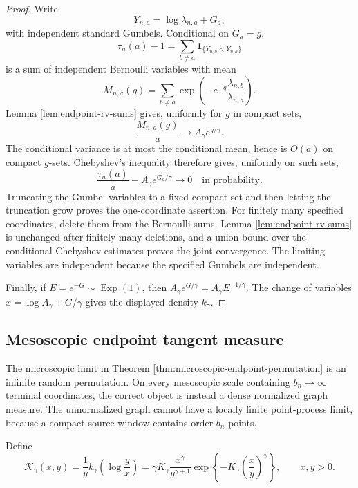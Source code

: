 \documentclass[11pt]{article}
\theoremstyle{remark}
\newcommand{\one}{\mathbf 1}
\newcommand{\Exp}{\operatorname{Exp}}
\begin{document}
\begin{proof}
Write
\[
        Y_{n,a}=\log\lambda_{n,a}+G_a,
\]
with independent standard Gumbels.  Conditional on $G_a=g$,
\[
        \tau_n(a)-1
        =\sum_{b\ne a}\one_{\{Y_{n,b}<Y_{n,a}\}}
\]
is a sum of independent Bernoulli variables with mean
\[
        M_{n,a}(g)=\sum_{b\ne a}
        \exp\left(-e^{-g}\frac{\lambda_{n,b}}{\lambda_{n,a}}\right).
\]
Lemma \ref{lem:endpoint-rv-sums} gives, uniformly for $g$ in compact sets,
\[
        \frac{M_{n,a}(g)}a\longrightarrow
        A_\gamma e^{g/\gamma}.
\]
The conditional variance is at most the conditional mean, hence is $O(a)$ on
compact $g$-sets.  Chebyshev's inequality therefore gives, uniformly on such
sets,
\[
        \frac{\tau_n(a)}a-A_\gamma e^{G_a/\gamma}
        \longrightarrow0
        \quad\text{in probability}.
\]
Truncating the Gumbel variables to a fixed compact set and then letting the
truncation grow proves the one-coordinate assertion.  For finitely many
specified coordinates, delete them from the Bernoulli sums.  Lemma
\ref{lem:endpoint-rv-sums} is unchanged after finitely many deletions, and a
union bound over the conditional Chebyshev estimates proves the joint
convergence.  The limiting variables are independent because the specified
Gumbels are independent.

Finally, if $E=e^{-G}\sim\Exp(1)$, then
$A_\gamma e^{G/\gamma}=A_\gamma E^{-1/\gamma}$.  The change of variables
$x=\log A_\gamma+G/\gamma$ gives the displayed density $k_\gamma$.
\end{proof}

\subsection{Mesoscopic endpoint tangent measure}
\label{subsec:endpoint-tangent}

The microscopic limit in Theorem \ref{thm:microscopic-endpoint-permutation} is
an infinite random permutation.  On every mesoscopic scale containing
$b_n\to\infty$ terminal coordinates, the correct object is instead a dense
normalized graph measure.  The unnormalized graph cannot have a locally finite
point-process limit, because a compact source window contains order $b_n$
points.

Define
\[
        \mathcal K_\gamma(x,y)
        =\frac1y k_\gamma\!\left(\log\frac yx\right)
        =\gamma K_\gamma\frac{x^\gamma}{y^{\gamma+1}}
        \exp\left\{-K_\gamma\left(\frac xy\right)^\gamma\right\},
        \qquad x,y>0.
\]
\end{document}

